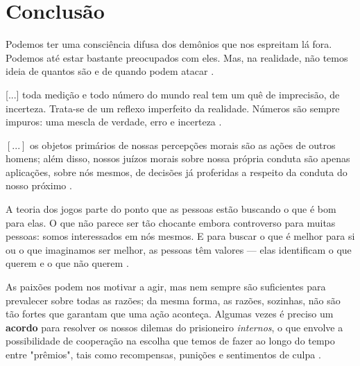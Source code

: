 \documentclass[
	article,			        %
	11pt,				          %
	oneside,			        %
	a4paper,			        %
	english,			        %
	brazil,				        %
	sumario=tradicional
]{abntex2}\usepackage[]{graphicx}\usepackage[]{color}
\begin{document}
% 

\section{Conclusão}


\begin{citacao}
  Podemos ter uma consciência difusa dos demônios que nos espreitam lá fora. Podemos até estar bastante preocupados com eles. Mas, na realidade, não temos ideia de quantos são e de quando podem atacar \cite{Nate.2012}.
\end{citacao}

\begin{citacao}

[...] toda medição e todo número do mundo real tem um quê de imprecisão, de incerteza. Trata-se de um reflexo imperfeito da realidade. Números são sempre impuros: uma mescla de verdade, erro e incerteza \cite{Seife.2012}.

\end{citacao}


\begin{citacao}
$\left [ ... \right ]$ os objetos primários de nossas percepções morais são as ações de outros homens; além disso, nossos juízos morais sobre nossa própria conduta são apenas aplicações, sobre nós mesmos, de decisões já proferidas a respeito da conduta do nosso próximo \cite{Smith.1999}.
\end{citacao}

\begin{citacao}
  A teoria dos jogos parte do ponto que as pessoas estão buscando o que é bom para elas. O que não parece ser tão chocante embora controverso para muitas pessoas: somos interessados em nós mesmos. E para buscar o que é melhor para si ou o que imaginamos ser melhor, as pessoas têm valores --- elas identificam o que querem e o que não querem \cite[min.~2:17--2:37]{MesquitaTED.2009}. 
\end{citacao}


\begin{citacao}
As paixões podem nos motivar a agir, mas nem sempre são suficientes para prevalecer sobre todas as razões; da mesma forma, as razões, sozinhas, não são tão fortes que garantam que uma ação aconteça. Algumas vezes é preciso um \textbf{acordo} para resolver os nossos dilemas do prisioneiro \emph{internos}, o que envolve a possibilidade de cooperação na escolha que temos de fazer ao longo do tempo entre "prêmios", tais como recompensas, punições e sentimentos de culpa \cite[p.~132]{Pimentel.2007}.
\end{citacao}
\end{document}
